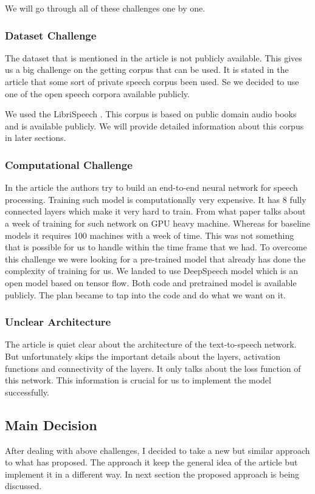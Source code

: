 We will go through all of these challenges one by one.
\subsubsection{Dataset Challenge}
The dataset that is mentioned in the article is not publicly available. This gives us a big challenge on the getting corpus that can be used. It is stated in the article that some sort of private speech corpus been used.  Se we decided to use one of the open speech corpora available publicly. 

We used the LibriSpeech \cite{DBLP:conf/icassp/PanayotovCPK15}. This corpus is based on public domain audio books and is available publicly. We will provide detailed information about this corpus in later sections. 

\subsubsection{Computational Challenge}
In the article the authors try to build an end-to-end neural network for speech processing. Training such model is computationally very expensive. It has 8 fully connected layers which make it very hard to train. From what paper talks about a week of training for such network on GPU heavy machine. Whereas for baseline models it requires 100 machines with a week of time.  This was not something that is possible for us to handle within the time frame that we had. To overcome this challenge we were looking for a pre-trained model that already has done the complexity of training for us. We landed to use DeepSpeech model \cite{DBLP:journals/corr/HannunCCCDEPSSCN14} which is an open model based on tensor flow. Both code and pretrained model is available publicly. The plan became to tap into the code and do what we want on it. 
\subsubsection{Unclear Architecture}
The article is quiet clear about the architecture of the text-to-speech network. But unfortunately skips the important details about the layers, activation functions and connectivity of the layers. It only talks about the loss function of this network. This information is crucial for us to implement the model successfully. 

\subsection{Main Decision}
After dealing with above challenges, I decided to take a new but similar approach to what \cite{wordembedspeech} has proposed. The approach it keep the general idea of the article but implement it in a different way. In next section the proposed approach is being discussed. 